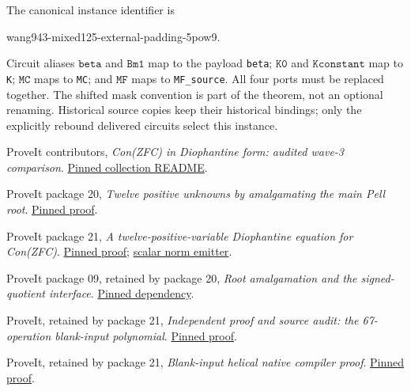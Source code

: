 \documentclass[11pt,a4paper]{article}
\theoremstyle{remark}\newtheorem{remark}[theorem]{Remark}
\newcommand{\repo}[2]{\href{https://github.com/VladimirReshetnikov/ProveIt/blob/ae3007ca4467011e0e051c84acb4a1dd13971b0e/#1}{#2}}
\begin{document}
The canonical instance identifier is
\begin{center}\small\ttfamily
wang943-mixed125-external-padding-5pow9.
\end{center}
Circuit aliases $\mathtt{beta}$ and $\mathtt{Bm1}$ map to the payload
\texttt{beta}; $\mathtt{K0}$ and $\mathtt{Kconstant}$ map to
\texttt{K}; $\mathtt{MC}$ maps to \texttt{MC}; and $\mathtt{MF}$ maps
to \texttt{MF\_source}. All four ports must be replaced together.
The shifted mask convention is part of the theorem, not an optional
renaming. Historical source copies keep their historical bindings;
only the explicitly rebound delivered circuits select this instance.

\begin{thebibliography}{99}\small
{} ProveIt contributors,
\emph{Con(ZFC) in Diophantine form: audited wave-3 comparison}.
\repo{SetTheory/Cardinals/docs/reports/hilbert-tenth-problem/con-zfc-diophantine-forms/README.md}{Pinned collection README}.

 ProveIt package 20,
\emph{Twelve positive unknowns by amalgamating the main Pell root}.
\repo{SetTheory/Cardinals/docs/reports/hilbert-tenth-problem/con-zfc-diophantine-forms/20-root12/amalgamation/ROOT12_PROOF.md}{Pinned proof}.

 ProveIt package 21,
\emph{A twelve-positive-variable Diophantine equation for Con(ZFC)}.
\repo{SetTheory/Cardinals/docs/reports/hilbert-tenth-problem/con-zfc-diophantine-forms/21-norm12/proofs/NORM12_PROOF.md}{Pinned proof};
\repo{SetTheory/Cardinals/docs/reports/hilbert-tenth-problem/con-zfc-diophantine-forms/21-norm12/arithmetic/build_norm12.py}{scalar norm emitter}.

 ProveIt package 09, retained by package 20,
\emph{Root amalgamation and the signed-quotient interface}.
\repo{SetTheory/Cardinals/docs/reports/hilbert-tenth-problem/con-zfc-diophantine-forms/20-root12/amalgamation/dependencies/09_ROOT_AMALGAMATION_PROOF.md}{Pinned dependency}.

 ProveIt, retained by package 21,
\emph{Independent proof and source audit: the 67-operation blank-input polynomial}.
\repo{SetTheory/Cardinals/docs/reports/hilbert-tenth-problem/con-zfc-diophantine-forms/21-norm12/upstream/FIXED_BLANK_67_PROOF.md}{Pinned proof}.

 ProveIt, retained by package 21,
\emph{Blank-input helical native compiler proof}.
\repo{SetTheory/Cardinals/docs/reports/hilbert-tenth-problem/con-zfc-diophantine-forms/21-norm12/upstream/BLANK_HELICAL_PROOF.md}{Pinned proof}.


\end{thebibliography}
\end{document}
